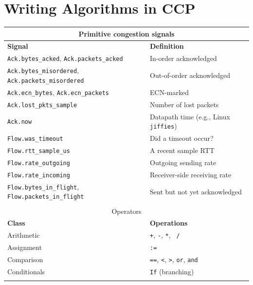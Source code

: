 \section{Writing Algorithms in CCP}
\label{sec:ccp}
\begin{table}
    \centering
    \footnotesize
    \begin{tabular}{@{} p{}p{}}
        \hline
        \hline
        \multicolumn{2}{c}{Primitive congestion signals} \\
        \hline
        \hline
        \textbf{Signal} & \textbf{Definition} \\
        \texttt{Ack.bytes\_acked}, \texttt{Ack.packets\_acked} & In-order acknowledged \\
        \texttt{Ack.bytes\_misordered}, \texttt{Ack.packets\_misordered} & Out-of-order acknowledged \\
        \texttt{Ack.ecn\_bytes}, \texttt{Ack.ecn\_packets} & ECN-marked \\
        \texttt{Ack.lost\_pkts\_sample} & Number of lost packets \\
        \texttt{Ack.now} & Datapath time (e.g., Linux \texttt{jiffies})\\
        \texttt{Flow.was\_timeout} & Did a timeout occur? \\
        \texttt{Flow.rtt\_sample\_us} & A recent sample RTT \\
        \texttt{Flow.rate\_outgoing} & Outgoing sending rate \\
        \texttt{Flow.rate\_incoming} & Receiver-side receiving rate  \\
        \texttt{Flow.bytes\_in\_flight}, \texttt{Flow.packets\_in\_flight} & Sent but not yet acknowledged \\
        & \\
        \hline
        \hline
        \multicolumn{2}{c}{Operators} \\
        \hline
        \hline
        \textbf{Class} & \textbf{Operations} \\
        Arithmetic & \texttt{+}, \texttt{-}, \texttt{*}, \texttt{~/} \\
        Assignment & \texttt{:=} \\
        Comparison & \texttt{==}, \texttt{<}, \texttt{>}, \texttt{or}, \texttt{and} \\
        Conditionals & \texttt{If} (branching) \\
        & \\
        \hline
        \hline

\end{tabular}
\end{table}
